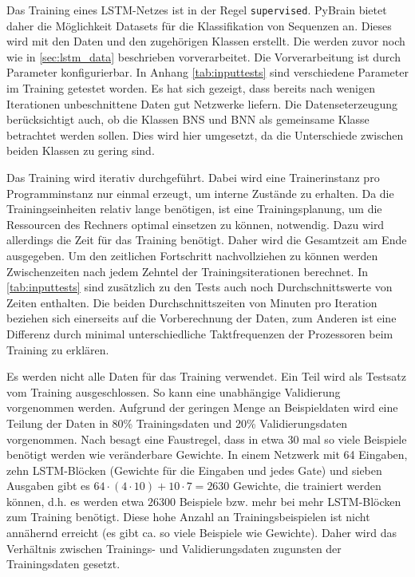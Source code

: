 Das Training eines \ac{LSTM}-Netzes ist in der Regel \texttt{supervised}.
PyBrain bietet daher die Möglichkeit Datasets für die Klassifikation von
Sequenzen an. Dieses wird mit den Daten und den zugehörigen Klassen erstellt.
Die werden zuvor noch wie in \autoref{sec:lstm_data} beschrieben vorverarbeitet.
Die Vorverarbeitung ist durch Parameter konfigurierbar. In Anhang
\autoref{tab:inputtests} sind verschiedene Parameter im Training getestet
worden. Es hat sich gezeigt, dass bereits nach wenigen Iterationen unbeschnittene
Daten gut Netzwerke liefern. Die Datenseterzeugung berücksichtigt auch, ob die
Klassen \ac{BNS} und \ac{BNN} als gemeinsame Klasse betrachtet werden sollen.
Dies wird hier umgesetzt, da die Unterschiede zwischen beiden Klassen zu gering
sind. 

Das Training wird iterativ durchgeführt. Dabei wird eine Trainerinstanz pro
Programminstanz nur einmal erzeugt, um interne Zustände zu erhalten. Da die
Trainingseinheiten relativ lange benötigen, ist eine Trainingsplanung, um die
Ressourcen des Rechners optimal einsetzen zu können, notwendig. Dazu wird
allerdings die Zeit für das Training benötigt. Daher wird die Gesamtzeit am Ende
ausgegeben. Um den zeitlichen Fortschritt nachvollziehen zu können werden
Zwischenzeiten nach jedem Zehntel der Trainingsiterationen berechnet. In
\autoref{tab:inputtests} sind zusätzlich zu den Tests auch noch
Durchschnittswerte von Zeiten enthalten. Die beiden Durchschnittszeiten von
Minuten pro Iteration beziehen sich einerseits auf die Vorberechnung der Daten,
zum Anderen ist eine Differenz durch minimal unterschiedliche Taktfrequenzen der
Prozessoren beim Training zu erklären.

Es werden nicht alle Daten für das Training verwendet. Ein Teil wird als
Testsatz vom Training ausgeschlossen. So kann eine unabhängige Validierung
vorgenommen werden. Aufgrund der geringen Menge an Beispieldaten wird eine
Teilung der Daten in 80\% Trainingsdaten und 20\% Validierungsdaten vorgenommen.
Nach \cite{NNFAQ} besagt eine Faustregel, dass in etwa 30 mal so viele Beispiele
benötigt werden wie veränderbare Gewichte. In einem Netzwerk mit 64 Eingaben,
zehn \ac{LSTM}-Blöcken (Gewichte für die Eingaben und jedes Gate) und sieben
Ausgaben gibt es $64\cdot(4\cdot10)+10\cdot7 = 2630$ Gewichte, die trainiert
werden können, d.h. es werden etwa $26300$ Beispiele bzw. mehr bei mehr
\ac{LSTM}-Blöcken zum Training benötigt. Diese hohe Anzahl an
Trainingsbeispielen ist nicht annähernd erreicht (es gibt ca. so viele Beispiele
wie Gewichte). Daher wird das Verhältnis zwischen Trainings- und
Validierungsdaten zugunsten der Trainingsdaten gesetzt.


